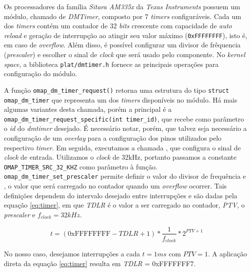 \vspace{12pt}

Os processadores da família \textit{Sitara AM335x} da \textit{Texas Instruments}
possuem um módulo, chamado de \textit{DMTimer}, composto por 7 \textit{timers}
configuráveis. Cada um dos \textit{timers} contém um contador de 32
\textit{bits} crescente com capacidade de \textit{auto reload} e geração de
interrupção ao atingir seu valor máximo (\texttt{0xFFFFFFFF}), isto é, em caso
de \textit{overflow}. Além disso, é possível configurar um divisor de frêquencia
(\textit{prescaler}) e escolher o sinal de \textit{clock} que será usado pelo
componente. No \textit{kernel space}, a biblioteca \texttt{plat/dmtimer.h}
fornece as principais operações para configuração do módulo. 

\vspace{12pt}

A função \texttt{omap\_dm\_timer\_request()} retorna uma estrutura do tipo
\texttt{struct omap\_dm\_timer} que representa um dos \textit{timers}
disponíveis no módulo. Há mais algumas variantes desta chamada, porém a
principal é a \texttt{omap\_dm\_timer\_request\_specific(int timer\_id)}, que
recebe como parâmetro o \textit{id} do \textit{dmtimer} desejado. É necessário
notar, porém, que talvez seja necessário a configuração de um \textit{overlay}
para a configuração dos pinos utilizados pelo respectivo \textit{timer}. Em
seguida, executamos a chamada , que
configura o sinal de \textit{clock} de entrada. Utilizamos o \textit{clock} de
32kHz, portanto passamos a constante \texttt{OMAP\_TIMER\_SRC\_32\_KHZ} como
parâmetro à função. \texttt{omap\_dm\_timer\_set\_prescaler} permite definir o
valor do divisor de frequência e , o
valor que será carregado no contador quando um \textit{overflow} ocorrer. Tais
definições dependem do intervalo desejado entre interrupções e são dadas pela
equação \ref{eq:timer}, em que \textit{TDLR} é o valor a ser carregado no
contador, \textit{PTV}, o \textit{prescaler} e \(f_{clock}=32kHz\).

\begin{equation} 
t = (\text{0xFFFFFFFF} - TDLR + 1)*\frac{1}{f_{clock}}*2^{PTV+1}
\label{eq:timer}
\end{equation}

No nosso caso, desejamos interrupções a cada \(t=1ms\) com \(PTV=1\). A
aplicação direta da equação \ref{eq:timer} resulta em \textit{TDLR} =
0xFFFFFFF7.

\vspace{12pt}

